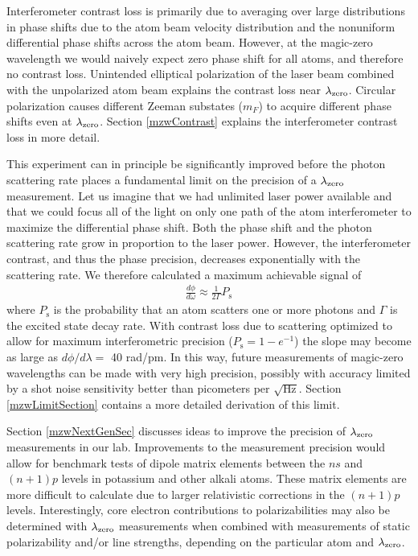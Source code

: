 Interferometer contrast loss is primarily due to averaging over large distributions in phase shifts due to the atom beam velocity distribution and the nonuniform differential phase shifts across the atom beam. However, at the magic-zero wavelength we would naively expect zero phase shift for all atoms, and therefore no contrast loss. Unintended elliptical polarization of the laser beam combined with the unpolarized atom beam explains the contrast loss near $\lambda_\textrm{zero}$. Circular polarization causes different Zeeman substates ($m_F$) to acquire different phase shifts even at $\lambda_\textrm{zero}$. Section \ref{mzwContrast} explains the interferometer contrast loss in more detail.


This experiment can in principle be significantly improved before the photon scattering rate places a fundamental limit on the precision of a $\lambda_\textrm{zero}$ measurement. Let us imagine that we had unlimited laser power available and that we could focus all of the light on only one path of the atom interferometer to maximize the differential phase shift. Both the phase shift and the photon scattering rate grow in proportion to the laser power. However, the interferometer contrast, and thus the phase precision, decreases exponentially with the scattering rate. We therefore calculated a maximum achievable signal of 
\begin{eqnarray}
\label{TOWlimit}
\frac{d\phi}{d\omega}\approx\frac{1}{2\Gamma}P_\textrm{s}
\end{eqnarray}
where $P_\textrm{s}$ is the probability that an atom scatters one or more photons and $\Gamma$ is the excited state decay rate. With contrast loss due to scattering optimized to allow for maximum interferometric precision ($P_\textrm{s} = 1-e^{-1}$) the slope may become as large as $d \phi / d \lambda = $ 40 rad/pm. In this way, future measurements of magic-zero wavelengths can be made with very high precision, possibly with accuracy limited by a shot noise sensitivity better than picometers per $\sqrt{\textrm{Hz}}$. Section \ref{mzwLimitSection} contains a more detailed derivation of this limit.


Section \ref{mzwNextGenSec} discusses ideas to improve the precision of $\lambda_\textrm{zero}$ measurements in our lab. Improvements to the measurement precision would allow for benchmark tests of dipole matrix elements between the $ns$ and $(n+1)p$ levels in potassium and other alkali atoms. These matrix elements are more difficult to calculate due to larger relativistic corrections in the $(n+1)p$ levels. Interestingly, core electron contributions to polarizabilities may also be determined with $\lambda_\textrm{zero}$ measurements when combined with measurements of static polarizability and/or line strengths, depending on the particular atom and $\lambda_\textrm{zero}$. 








